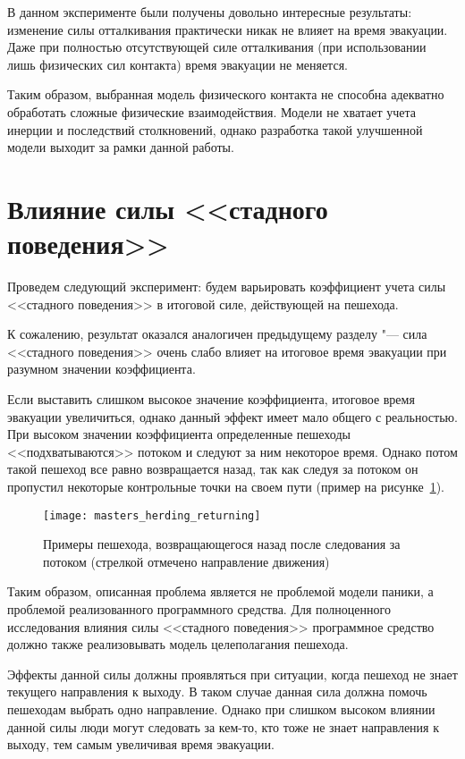 В данном эксперименте были получены довольно интересные результаты: изменение силы отталкивания практически никак не влияет на время эвакуации.
Даже при полностью отсутствующей силе отталкивания (при использовании лишь физических сил контакта) время эвакуации не меняется.

Таким образом, выбранная модель физического контакта не способна адекватно обработать сложные физические взаимодействия.
Модели не хватает учета инерции и последствий столкновений, однако разработка такой улучшенной модели выходит за рамки данной работы.

\section{Влияние силы <<стадного поведения>>}
\label{sec:results:herding}

Проведем следующий эксперимент: будем варьировать коэффициент учета силы <<стадного поведения>> в итоговой силе, действующей на пешехода.

К сожалению, результат оказался аналогичен предыдущему разделу "---
сила <<стадного поведения>> очень слабо влияет на итоговое время эвакуации при разумном значении коэффициента.

Если выставить слишком высокое значение коэффициента, итоговое время эвакуации увеличиться, однако данный эффект имеет мало общего с реальностью.
При высоком значении коэффициента определенные пешеходы <<подхватываются>> потоком и следуют за ним некоторое время.
Однако потом такой пешеход все равно возвращается назад, так как следуя за потоком он пропустил некоторые контрольные точки на своем пути (пример на рисунке~\ref{sec:results:herding:returning}).

\begin{figure}[ht!]
  \centering
  \texttt{[image: masters\_herding\_returning]}
  \caption{Примеры пешехода, возвращающегося назад после следования за потоком (стрелкой отмечено направление движения)}
  \label{sec:results:herding:returning}
\end{figure}

Таким образом, описанная проблема является не проблемой модели паники, а проблемой реализованного программного средства.
Для полноценного исследования влияния силы <<стадного поведения>> программное средство должно также реализовывать модель целеполагания пешехода.

Эффекты данной силы должны проявляться при ситуации, когда пешеход не знает текущего направления к выходу.
В таком случае данная сила должна помочь пешеходам выбрать одно направление.
Однако при слишком высоком влиянии данной силы люди могут следовать за кем-то,
кто тоже не знает направления к выходу, тем самым увеличивая время эвакуации.

